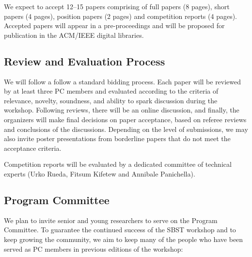 \documentclass[10pt,conference]{IEEEtran}
\begin{document}
We expect to accept 12--15 papers comprising of full papers (8 pages),
short papers (4 pages), position papers (2 pages) and competition
reports (4 pages).  Accepted papers will appear in a pre-proceedings
and will be proposed for publication in the ACM/IEEE digital
libraries.

\subsection{Review and Evaluation Process}

We will follow a follow a standard bidding process. Each paper will be
reviewed by at least three PC members and evaluated according to the
criteria of relevance, novelty, soundness, and ability to spark
discussion during the workshop. Following reviews, there will be an
online discussion, and finally, the organizers will make final
decisions on paper acceptance, based on referee reviews and
conclusions of the discussions. Depending on the level of submissions,
we may also invite poster presentations from borderline papers that do
not meet the acceptance criteria.

Competition reports will be evaluated
by a dedicated committee of technical experts (Urko Rueda, Fitsum
Kifetew and Annibale Panichella).

\subsection{Program Committee}

We plan to invite senior and young researchers to serve on the Program
Committee. To guarantee the continued success of the SBST workshop and
to keep growing the community, we aim to keep many of the people who
have been served as PC members in previous editions of the workshop:
\end{document}
